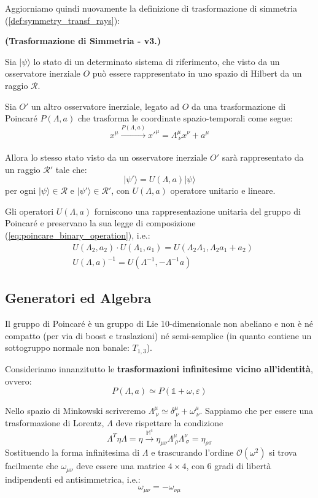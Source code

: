 \documentclass[../main.tex]{subfiles}
\begin{document}
Aggiorniamo quindi nuovamente la definizione di trasformazione di simmetria (\ref{def:symmetry_transf_rays}):

\begin{definition}
    \textbf{(Trasformazione di Simmetria - v3.)}

    Sia $|\psi\rangle$ lo stato di un determinato sistema di riferimento, che visto da un osservatore inerziale $O$ può essere rappresentato in uno spazio di Hilbert da un raggio $\mathscr R$. 
    
    Sia $O'$ un altro osservatore inerziale, legato ad $O$ da una trasformazione di Poincaré $P(\Lambda, a)$ che trasforma le coordinate spazio-temporali come segue:
    \[
    x^\mu\xrightarrow[]{P(\Lambda, a)} x'^\mu = \Lambda^\mu_{~\nu} x^\nu+a^\mu
    \]

    Allora lo stesso stato visto da un osservatore inerziale $O'$ sarà rappresentato da un raggio $\mathscr R'$ tale che:
    \[|\psi'\rangle = U(\Lambda,a)|\psi\rangle \]
   per ogni \(|\psi\rangle \in \mathscr R\) e \(|\psi'\rangle \in \mathscr R'\),  con $U(\Lambda,a)$ operatore unitario e lineare.
    \label{def:symmetry_transf_final}
\end{definition}

Gli operatori \(U(\Lambda,a)\) forniscono una rappresentazione unitaria del gruppo di Poincaré e preservano la sua legge di composizione (\ref{eq:poincare_binary_operation}), i.e.:
\[
\boxed{
\begin{aligned}
    &U(\Lambda_2, a_2)\cdot U(\Lambda_1, a_1) = U(\Lambda_2\Lambda_1,\Lambda_2 a_1 +  a_2)\\
    &U(\Lambda, a)^{-1} = U(\Lambda^{-1}, -\Lambda^{-1}a)
\end{aligned}}
\]

\subsection{Generatori ed Algebra}
Il gruppo di Poincaré è un gruppo di Lie 10-dimensionale non abeliano e non è né compatto (per via di boost e traslazioni) né semi-semplice (in quanto contiene un sottogruppo normale non banale: $T_{1,3}$).

Consideriamo innanzitutto le \textbf{trasformazioni infinitesime vicino all'identità}, ovvero:
\[
\boxed{P(\Lambda, a) \simeq P(\mathbb 1 + \omega, \varepsilon)}
\]

Nello spazio di Minkowski scriveremo \(\Lambda^\mu_{~\nu} \simeq \delta^\mu_{~\nu} +\omega^\mu_{~\nu}\). Sappiamo che per essere una trasformazione di Lorentz, $\Lambda$ deve rispettare la condizione
\[
\Lambda^T \eta\Lambda = \eta \xrightarrow{\mathbb M^4} \boxed{\eta_{\mu\nu}\Lambda^\mu_{~\rho}\Lambda^\nu_{~\sigma} = \eta_{\rho\sigma}}
\]
Sostituendo la forma infinitesima di $\Lambda$ e trascurando l'ordine $\mathscr O(\omega^2)$ si trova facilmente che $\omega_{\mu\nu}$ deve essere una matrice $4\times4$, con 6 gradi di libertà indipendenti ed antisimmetrica, i.e.:
\[
\boxed{\omega_{\mu\nu} = - \omega_{\nu\mu}}
\]
\end{document}
